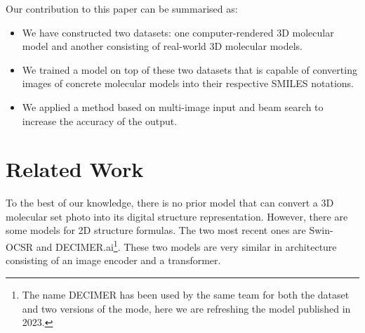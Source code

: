 \documentclass{article}
\begin{document}
Our contribution to this paper can be summarised as:
\begin{itemize}
\item We have constructed two datasets: one computer-rendered 3D molecular model and another consisting of real-world 3D molecular models.
\item We trained a model on top of these two datasets that is capable of converting images of concrete molecular models into their respective SMILES notations. 
\item We applied a method based on multi-image input and beam search to increase the accuracy of the output.
\end{itemize}

\section{Related Work}
To the best of our knowledge, there is no prior model that can convert a 3D molecular set photo into its digital structure representation. However, there are some models for 2D structure formulas. The two most recent ones are Swin-OCSR\autocite{swinocsr} and DECIMER.ai\footnote{The name DECIMER has been used by the same team for both the dataset and two versions of the mode, here we are refreshing the model published in 2023.}\autocite{decimer}. These two models are very similar in architecture consisting of an image encoder and a transformer.

\end{document}
